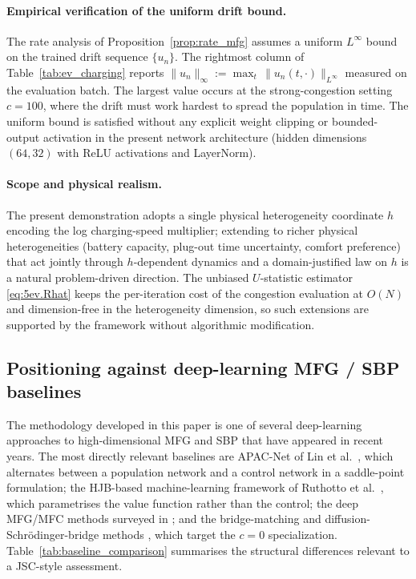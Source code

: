 \documentclass[11pt,leqno]{article}
\theoremstyle{plain}
\theoremstyle{remark}
\theoremstyle{definition}
\numberwithin{equation}{section}
\numberwithin{figure}{section}
\numberwithin{table}{section}
\numberwithin{algorithm}{section}
\begin{document}
\paragraph{Empirical verification of the uniform drift bound.}
The rate analysis of Proposition~\ref{prop:rate_mfg} assumes a uniform $L^\infty$ bound
on the trained drift sequence $\{u_n\}$.
The rightmost column of Table~\ref{tab:ev_charging} reports
$\|u_n\|_\infty:=\max_t\,\|u_n(t,\cdot)\|_{L^\infty}$ measured on the evaluation batch.
The largest value occurs at the strong-congestion setting $c=100$,
where the drift must work hardest to spread the population in time.
The uniform bound is satisfied without any explicit weight clipping or bounded-output activation
in the present network architecture (hidden dimensions $(64,32)$ with ReLU activations and LayerNorm).

\paragraph{Scope and physical realism.}
The present demonstration adopts a single physical heterogeneity coordinate $h$
encoding the log charging-speed multiplier;
extending to richer physical heterogeneities (battery capacity, plug-out time uncertainty, comfort preference)
that act jointly through $h$-dependent dynamics and a domain-justified law on $h$
is a natural problem-driven direction.
The unbiased $U$-statistic estimator \eqref{eq:5ev.Rhat} keeps the per-iteration
cost of the congestion evaluation at $O(N)$ and dimension-free in the heterogeneity dimension,
so such extensions are supported by the framework without algorithmic modification.


\subsection{Positioning against deep-learning MFG / SBP baselines}\label{sec:5.7baselines}

The methodology developed in this paper is one of several deep-learning approaches to high-dimensional MFG and SBP that have appeared in recent years.
The most directly relevant baselines are
APAC-Net of Lin et al.~\cite{lin-etal:2021apac}, which alternates between a population network and a control network in a saddle-point formulation;
the HJB-based machine-learning framework of Ruthotto et al.~\cite{rut-etal:2020}, which parametrises the value function rather than the control;
the deep MFG/MFC methods surveyed in \cite{car-lau:2022,car-lau:2021};
and the bridge-matching and diffusion-Schr{\"o}dinger-bridge methods
\cite{de-etal:2021,var-etal:2021,shi-etal:2023dsbm,Tong2024}, which target the $c=0$ specialization.
Table~\ref{tab:baseline_comparison} summarises the structural differences relevant to a JSC-style assessment.
\end{document}
